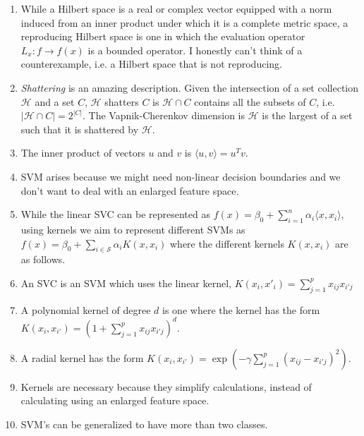 \documentclass{article}
\begin{document}
\begin{enumerate}
    \item While a Hilbert space is a real or complex vector equipped with a norm induced from an inner product under which it is a complete metric space, a reproducing Hilbert space is one in which the evaluation operator $L_x: f \rightarrow f(x)$ is a bounded operator. I honestly can't think of a counterexample, i.e. a Hilbert space that is not reproducing.
    \item \textit{Shattering} is an amazing description. Given the intersection of a set collection $\mathcal{H}$ and a set $C$, $\mathcal{H}$ shatters $C$ is $\mathcal{H} \cap C$ contains all the subsets of $C$, i.e. $|\mathcal{H} \cap C| = 2^{|C|}$. The Vapnik-Cherenkov dimension is $\mathcal{H}$ is the largest of a set such that it is shattered by $\mathcal{H}$. 
    \item The inner product of vectors $u$ and $v$ is $\langle u,v \rangle = u^Tv$.
    \item SVM arises because we might need non-linear decision boundaries and we don't want to deal with an enlarged feature space.
    \item While the linear SVC can be represented as $f(x) = \beta_0+\sum^n_{i=1} \alpha_i\langle x,x_i \rangle$, using kernels we aim to represent different SVMs as $f(x) = \beta_0 + \sum_{i\in \mathcal{S}} \alpha_i K(x,x_i)$ where the different kernels $K(x,x_i)$ are as follows.
    \item An SVC is an SVM which uses the linear kernel, $K(x_i,x'_i) = \sum^p_{j=1}x_{ij}x_{i'j}$
    \item A polynomial kernel of degree $d$ is one where the kernel has the form $K(x_i,x_{i'}) = (1+\sum^p_{j=1} x_{ij}x_{i'j})^d$.
    \item A radial kernel has the form $K(x_i,x_{i'}) = \exp(-\gamma \sum^p_{j=1}(x_{ij}-x_{i'j})^2)$. 
    \item Kernels are necessary because they simplify calculations, instead of calculating using an enlarged feature space.
    \item  SVM's can be generalized to have more than two classes.
\end{enumerate}
\end{document}
